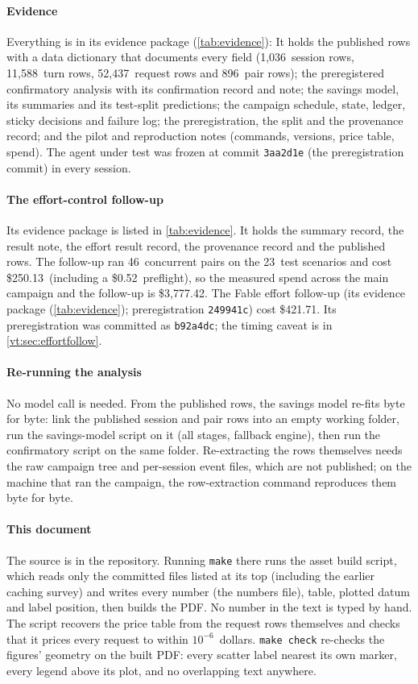 \documentclass[11pt,letterpaper]{article}
\newcommand{\code}[1]{\texttt{#1}}
\newcommand{\BuildSha}{3aa2d1e}
\newcommand{\EcPairs}{46}
\newcommand{\EcPreflight}{0.52}
\newcommand{\EcPreregSha}{b92a4dc}
\newcommand{\EcScen}{23}
\newcommand{\EcSpend}{250.13}
\newcommand{\EfPreregSha}{249941c}
\newcommand{\EfSpend}{421.71}
\newcommand{\NPairs}{896}
\newcommand{\NRequests}{52{,}437}
\newcommand{\NSessions}{1{,}036}
\newcommand{\NTurns}{11{,}588}
\newcommand{\PriceResidual}{$10^{-6}$}
\newcommand{\SpendWithFollowup}{3{,}777.42}
\begin{document}
\paragraph{Evidence} Everything is in its evidence package (\cref{tab:evidence}):
It holds the published rows with a data dictionary that documents every field (\NSessions\ session rows, \NTurns\
turn rows, \NRequests\ request rows and \NPairs\ pair rows); the preregistered confirmatory analysis with its
confirmation record and note; the savings model, its summaries and its test-split predictions; the campaign schedule,
state, ledger, sticky decisions and failure log; the preregistration, the split and the provenance record; and the pilot
and reproduction notes (commands, versions, price table, spend).
The agent under test was frozen at commit \code{\BuildSha} (the preregistration commit) in every session.

\paragraph{The effort-control follow-up} Its evidence package is listed in \cref{tab:evidence}. It holds the summary record, the result note, the effort result record, the provenance record and the
published rows. The follow-up ran \EcPairs\ concurrent pairs on the \EcScen\ test scenarios and cost
\$\EcSpend\ (including a \$\EcPreflight\ preflight), so the measured spend across the main campaign and the
follow-up is \$\SpendWithFollowup. The Fable effort follow-up
(its evidence package (\cref{tab:evidence}); preregistration \code{\EfPreregSha}) cost \$\EfSpend. Its preregistration was committed as \code{\EcPreregSha}; the timing caveat is
in \cref{vt:sec:effortfollow}.

\paragraph{Re-running the analysis} No model call is needed. From the published rows, the savings model
re-fits byte for byte: link the published session and pair rows into an empty working folder, run the savings-model script on it (all stages, fallback engine), then run the confirmatory script on the same folder.
Re-extracting the rows themselves needs the raw campaign tree and per-session event files, which are not
published; on the machine that ran the campaign, the row-extraction command reproduces them byte for byte.

\paragraph{This document} The source is in the repository. Running
\code{make} there runs the asset build script, which reads only the committed files listed at its top
(including the earlier caching survey) and writes every number
(the numbers file), table, plotted datum and label position, then builds the PDF. No number in
the text is typed by hand. The script recovers the price table from the request rows themselves and checks
that it prices every request to within \PriceResidual\ dollars. \code{make check} re-checks the figures'
geometry on the built PDF: every scatter label nearest its own marker, every legend above its plot, and no
overlapping text anywhere.
\end{document}

